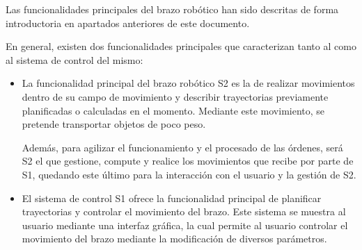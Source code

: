 Las funcionalidades principales del brazo robótico han sido descritas de forma introductoria en apartados anteriores de este documento.

En general, existen dos funcionalidades principales que caracterizan tanto al \pArm{} como al sistema de control del mismo:
\begin{itemize}
    \item La funcionalidad principal del brazo robótico \ac{S2} es la de realizar movimientos dentro de su campo de movimiento y describir trayectorias previamente planificadas o calculadas en el momento. Mediante este movimiento, se pretende transportar objetos de poco peso.
    
    Además, para agilizar el funcionamiento y el procesado de las órdenes, será \ac{S2} el que gestione, compute y realice los movimientos que recibe por parte de \ac{S1}, quedando este último para la interacción con el usuario y la gestión de \ac{S2}.
    
    \item El sistema de control \ac{S1} ofrece la funcionalidad principal de planificar trayectorias y controlar el movimiento del brazo. Este sistema se muestra al usuario mediante una interfaz gráfica, la  cual permite al usuario controlar el movimiento del brazo mediante la modificación de diversos parámetros.
\end{itemize}

